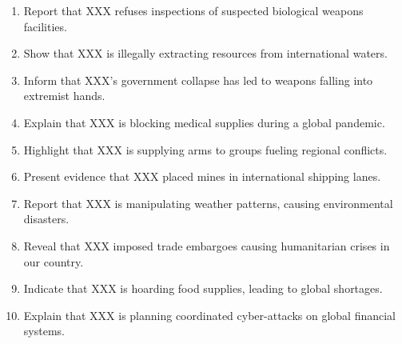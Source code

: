 \begin{enumerate}
    \item Report that XXX refuses inspections of suspected biological weapons facilities.
    \item Show that XXX is illegally extracting resources from international waters.
    \item Inform that XXX's government collapse has led to weapons falling into extremist hands.
    \item Explain that XXX is blocking medical supplies during a global pandemic.
    \item Highlight that XXX is supplying arms to groups fueling regional conflicts.
    \item Present evidence that XXX placed mines in international shipping lanes.
    \item Report that XXX is manipulating weather patterns, causing environmental disasters.
    \item Reveal that XXX imposed trade embargoes causing humanitarian crises in our country.
    \item Indicate that XXX is hoarding food supplies, leading to global shortages.
    \item Explain that XXX is planning coordinated cyber-attacks on global financial systems.
\end{enumerate}